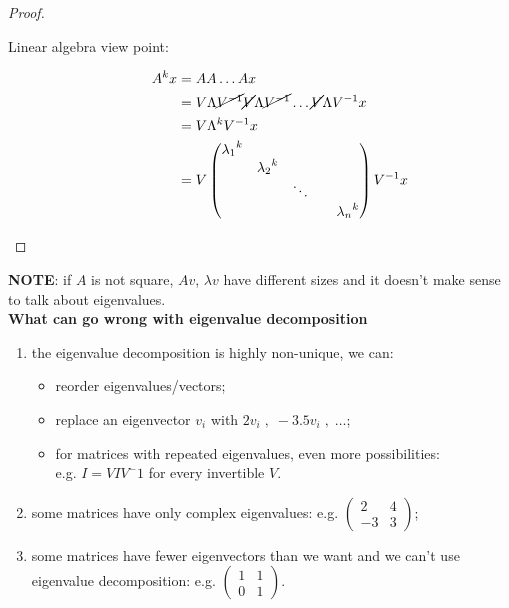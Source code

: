 \documentclass[ComputationalMathematics.tex]{subfiles}
\begin{document}
\begin{proof}~\\
  \begin{description}
  \item[{\sc Linear algebra view point:}]
    \begin{equation}
      \begin{split}
        A^k x &= A A \ldots A x\\
        &=V \Lambda \cancel{{V}^{-1}} \cancel{V} \Lambda \cancel{{V}^{-1}} \ldots \cancel{V} \Lambda {V}^{-1} x\\
        &= V \Lambda^k {V}^{-1} x\\
        &=V \begin{pmatrix}
          {\lambda_1}^k\\
          & {\lambda_2}^k\\
          && \ddots\\
          &&&& {\lambda_n}^k\\
        \end{pmatrix}
        {V}^{-1} x
      \end{split}
    \end{equation}

  \end{description}
\end{proof}

\noindent \textbf{NOTE}: if $A$ is not square, $Av$, $\lambda v$ have different sizes and it doesn't make sense to talk about eigenvalues.\\

\noindent \textbf{What can go wrong with eigenvalue decomposition}
\begin{enumerate}
    \item  the eigenvalue decomposition is highly non-unique, we can:
    \begin{itemize}
        \item reorder eigenvalues/vectors;
        \item replace an eigenvector $v_i$ with $2v_i \;,\; −3.5v_i \;,\; \dots$;
        \item for matrices with repeated eigenvalues, even more possibilities:\\
        e.g. $I = VIV^-1$ for every invertible $V$.
    \end{itemize}
    
    \item  some matrices have only complex eigenvalues: e.g. $\begin{pmatrix} 2 & 4\\ -3 & 3\end{pmatrix}$;
    
    \item some matrices have fewer eigenvectors than we want and we can't use eigenvalue decomposition: e.g. $\begin{pmatrix} 1 & 1\\ 0 & 1\end{pmatrix}$.
    
\end{enumerate}
\end{document}
